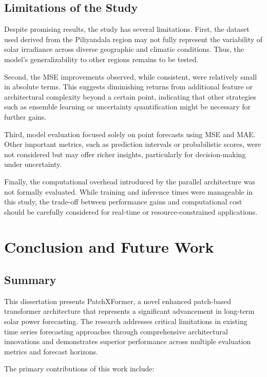 \documentclass[12pt]{uomthesis}
\begin{document}
\section{Limitations of the Study}

Despite promising results, the study has several limitations. First, the dataset used derived from the Piliyandala region may not fully represent the variability of solar irradiance across diverse geographic and climatic conditions. Thus, the model's generalizability to other regions remains to be tested.

Second, the MSE improvements observed, while consistent, were relatively small in absolute terms. This suggests diminishing returns from additional feature or architectural complexity beyond a certain point, indicating that other strategies such as ensemble learning or uncertainty quantification might be necessary for further gains.

Third, model evaluation focused solely on point forecasts using MSE and MAE. Other important metrics, such as prediction intervals or probabilistic scores, were not considered but may offer richer insights, particularly for decision-making under uncertainty.

Finally, the computational overhead introduced by the parallel architecture was not formally evaluated. While training and inference times were manageable in this study, the trade-off between performance gains and computational cost should be carefully considered for real-time or resource-constrained applications.



\chapter{Conclusion and Future Work}

\section{Summary}

This dissertation presents PatchXFormer, a novel enhanced patch-based transformer architecture that represents a significant advancement in long-term solar power forecasting. The research addresses critical limitations in existing time series forecasting approaches through comprehensive architectural innovations and demonstrates superior performance across multiple evaluation metrics and forecast horizons.

The primary contributions of this work include:
\end{document}
